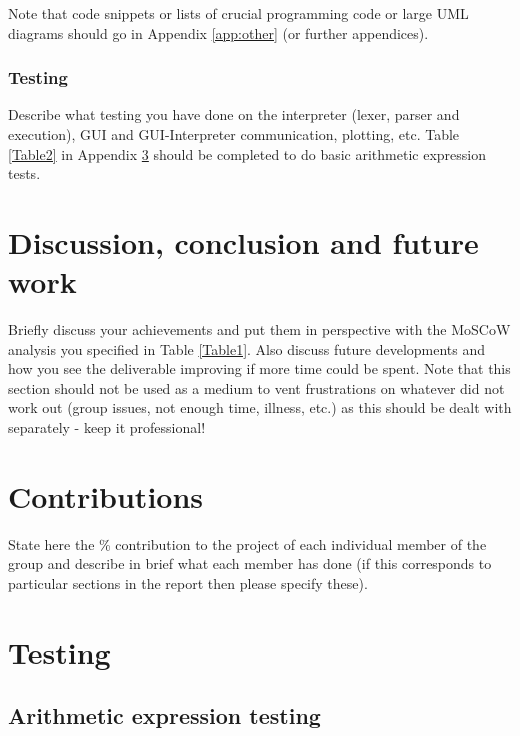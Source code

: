 \documentclass[a4paper, oneside, 11pt]{report}
\begin{document}
Note that code snippets or lists of crucial programming code or large UML diagrams should go in Appendix \ref{app:other} (or further appendices).

\subsection{Testing}

Describe what testing you have done on the interpreter (lexer, parser and execution), GUI and GUI-Interpreter communication, plotting, etc. Table \ref{Table2} in Appendix \ref{app:test} should be completed to do basic arithmetic expression tests.


\chapter{Discussion, conclusion and future work}

Briefly discuss  your achievements and put them in perspective with the MoSCoW analysis you specified in Table \ref{Table1}. Also discuss future developments and how you see the deliverable improving if more time could be spent. Note that this section should not be used as a medium to vent frustrations on whatever did not work out (group issues, not enough time, illness, etc.) as this should be dealt with separately - keep it professional!



\raggedright



\appendix
\chapter{Contributions}

State here the \% contribution to the project of each individual member of the group and describe in brief what each member has done (if this corresponds to particular sections in the report then please specify these).

\chapter{Testing}
\label{app:test}
\section{Arithmetic expression testing}
\end{document}
